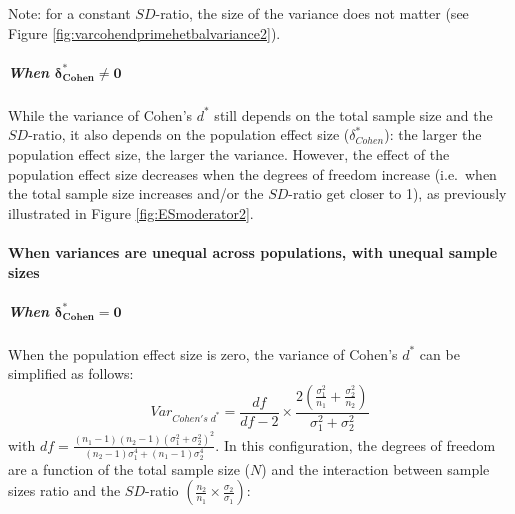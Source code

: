 \documentclass[
  english,
  man,mask]{apa6}
\let\oldparagraph\paragraph
\renewcommand{\paragraph}[1]{\oldparagraph{#1}\mbox{}}
\let\oldsubparagraph\subparagraph
\renewcommand{\subparagraph}[1]{\oldsubparagraph{#1}\mbox{}}
\begin{document}
Note: for a constant \(SD\)-ratio, the size of the variance does not matter (see Figure \ref{fig:varcohendprimehetbalvariance2}).

\hypertarget{when-bmdelta_cohen-neq-0-1}{%
\subparagraph{\texorpdfstring{When \(\bm{\delta^*_{Cohen} \neq 0}\)}{When \textbackslash bm\{\textbackslash delta\^{}*\_\{Cohen\} \textbackslash neq 0\}}}\label{when-bmdelta_cohen-neq-0-1}}

While the variance of Cohen's \(d^*\) still depends on the total sample size and the \(SD\)-ratio, it also depends on the population effect size (\(\delta^*_{Cohen}\)): the larger the population effect size, the larger the variance. However, the effect of the population effect size decreases when the degrees of freedom increase (i.e.~when the total sample size increases and/or the \(SD\)-ratio get closer to 1), as previously illustrated in Figure \ref{fig:ESmoderator2}.

\hypertarget{when-variances-are-unequal-across-populations-with-unequal-sample-sizes-3}{%
\paragraph{When variances are unequal across populations, with unequal sample sizes}\label{when-variances-are-unequal-across-populations-with-unequal-sample-sizes-3}}

\hypertarget{when-bmdelta_cohen-0-2}{%
\subparagraph{\texorpdfstring{When \(\bm{\delta^*_{Cohen} = 0}\)}{When \textbackslash bm\{\textbackslash delta\^{}*\_\{Cohen\} = 0\}}}\label{when-bmdelta_cohen-0-2}}

When the population effect size is zero, the variance of Cohen's \(d^*\) can be simplified as follows:
\[Var_{Cohen's \; d^*} = \frac{df}{df-2} \times \frac{2\left( \frac{\sigma^2_1}{n_1} + \frac{\sigma^2_2}{n_2} \right)}{\sigma^2_1+\sigma^2_2}\]
with \(df =\frac{(n_1-1)(n_2-1)(\sigma^2_1+\sigma^2_2)^2}{(n_2-1)\sigma_1^4+(n_1-1)\sigma_2^4}\). In this configuration, the degrees of freedom are a function of the total sample size (\(N\)) and the interaction between sample sizes ratio and the \(SD\)-ratio \(\left(\frac{n_2}{n_1}\times\frac{\sigma_2}{\sigma_1} \right)\):
\end{document}
